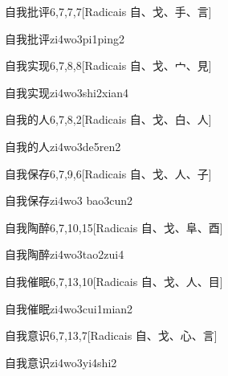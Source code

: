 \begin{entry}{自我批评}{6,7,7,7}[Radicais ⾃、⼽、⼿、⾔]
  \begin{phonetics}{自我批评}{zi4wo3pi1ping2}
  \end{phonetics}
\end{entry}

\begin{entry}{自我实现}{6,7,8,8}[Radicais ⾃、⼽、⼧、⾒]
  \begin{phonetics}{自我实现}{zi4wo3shi2xian4}
  \end{phonetics}
\end{entry}

\begin{entry}{自我的人}{6,7,8,2}[Radicais ⾃、⼽、⽩、⼈]
  \begin{phonetics}{自我的人}{zi4wo3de5ren2}
  \end{phonetics}
\end{entry}

\begin{entry}{自我保存}{6,7,9,6}[Radicais ⾃、⼽、⼈、⼦]
  \begin{phonetics}{自我保存}{zi4wo3 bao3cun2}
  \end{phonetics}
\end{entry}

\begin{entry}{自我陶醉}{6,7,10,15}[Radicais ⾃、⼽、⾩、⾣]
  \begin{phonetics}{自我陶醉}{zi4wo3tao2zui4}
  \end{phonetics}
\end{entry}

\begin{entry}{自我催眠}{6,7,13,10}[Radicais ⾃、⼽、⼈、⽬]
  \begin{phonetics}{自我催眠}{zi4wo3cui1mian2}
  \end{phonetics}
\end{entry}

\begin{entry}{自我意识}{6,7,13,7}[Radicais ⾃、⼽、⼼、⾔]
  \begin{phonetics}{自我意识}{zi4wo3yi4shi2}
  \end{phonetics}
\end{entry}

